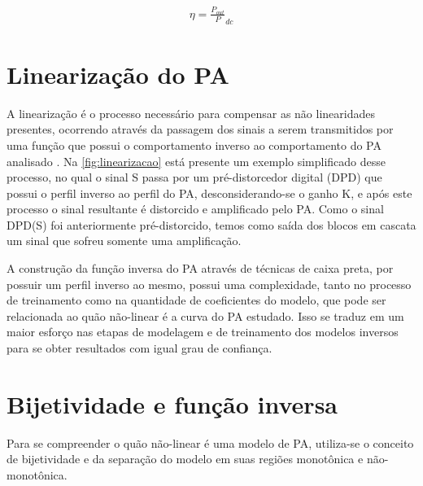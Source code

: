 \begin{align}
\eta = \frac{P_{out}}P_{dc}
\label{eq:resultado}
\end{align}

\section{Linearização do PA} \label{sec:fundteo-line}
A linearização é o processo necessário para compensar as não linearidades presentes, ocorrendo através da passagem dos sinais a serem transmitidos por uma função que possui o comportamento inverso ao comportamento do PA analisado \cite{kenington_high-linearity_2000}. Na \autoref{fig:linearizacao} está presente um exemplo simplificado desse processo, no qual o sinal S passa por um pré-distorcedor digital (DPD) que possui o perfil inverso ao perfil do PA, desconsiderando-se o ganho K, e após este processo o sinal resultante é distorcido e amplificado pelo PA. Como o sinal DPD(S) foi anteriormente pré-distorcido, temos como saída dos blocos em cascata um sinal que sofreu somente uma amplificação.


A construção da função inversa do PA através de técnicas de caixa preta, por possuir um perfil inverso ao mesmo, possui uma complexidade, tanto no processo de treinamento como na quantidade de coeficientes do modelo, que pode ser relacionada ao quão não-linear é a curva do PA estudado. Isso se traduz em um maior esforço nas etapas de modelagem e de treinamento dos modelos inversos para se obter resultados com igual grau de confiança.

\section{Bijetividade e função inversa} \label{sec:fundteo-bije}
Para se compreender o quão não-linear é uma modelo de PA, utiliza-se o conceito de bijetividade e da separação do modelo em suas regiões monotônica e não-monotônica.

